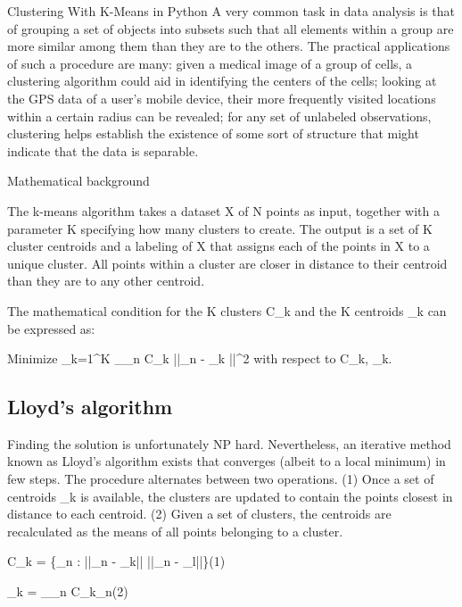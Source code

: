

Clustering With K-Means in Python
A very common task in data analysis is that of grouping a set of objects into subsets such that all elements within a group are more similar among them than they are to the others. The practical applications of such a procedure are many: given a medical image of a group of cells, a clustering algorithm could aid in identifying the centers of the cells; looking at the GPS data of a user’s mobile device, their more frequently visited locations within a certain radius can be revealed; for any set of unlabeled observations, clustering helps establish the existence of some sort of structure that might indicate that the data is separable.

Mathematical background

The k-means algorithm takes a dataset X of N points as input, together with a parameter K specifying how many clusters to create. The output is a set of K cluster centroids and a labeling of X that assigns each of the points in X to a unique cluster. All points within a cluster are closer in distance to their centroid than they are to any other centroid.

The mathematical condition for the K clusters C_k and the K centroids \mu_k can be expressed as:

Minimize \displaystyle \sum_{k=1}^K \sum_{_n \in C_k} ||_n - \mu_k ||^2 with respect to \displaystyle C_k, \mu_k.

\subsection*{Lloyd’s algorithm}

Finding the solution is unfortunately NP hard. Nevertheless, an iterative method known as Lloyd’s algorithm exists that converges (albeit to a local minimum) in few steps. The procedure alternates between two operations. (1) Once a set of centroids \mu_k is available, the clusters are updated to contain the points closest in distance to each centroid. (2) Given a set of clusters, the centroids are recalculated as the means of all points belonging to a cluster.

\displaystyle C_k = \{_n : ||_n - \mu_k|| \leq {} ||_n - \mu_l||\}\qquad(1)

\displaystyle \mu_k = \sum_{_n \in C_k}_n\qquad(2)

